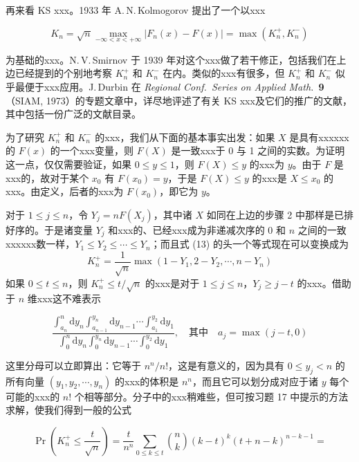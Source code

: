再来看 KS xxx。1933 年 A.\,N.\,Kolmogorov 提出了一个以xxx

\begin{equation}
K_n = \sqrt{n} \max_{-\infty < x < +\infty} |F_n(x) - F(x)| = \max(K_n^+, K_n^-) \tag{23}
\end{equation}

\noindent 为基础的xxx。N.\,V.\,Smirnov 于 1939 年对这个xxx做了若干修正，包括我们在上边已经提到的个别地考察 $K_n^+$ 和 $K_n^-$ 在内。类似的xxx有很多，但 $K_n^+$ 和 $K_n^-$ 似乎最便于xxx应用。J.\,Durbin 在 \textit{Regional Conf.\ Series on Applied Math.}\ \textbf{9}（SIAM, 1973）的专题文章中，详尽地评述了有关 KS xxx及它们的推广的文献，其中包括一份广泛的文献目录。

为了研究 $K_n^+$ 和 $K_n^-$ 的xxx，我们从下面的基本事实出发：如果 $X$ 是具有xxxxxx的 $F(x)$ 的一个xxx变量，则 $F(X)$ 是一致xxx于 0 与 1 之间的实数。为证明这一点，仅仅需要验证，如果 $0 \leqslant y \leqslant 1$，则 $F(X) \leqslant y$ 的xxx为 $y$。由于 $F$ 是xxx的，故对于某个 $x_0$ 有 $F(x_0) = y$，于是 $F(X) \leqslant y$ 的xxx是 $X \leqslant x_0$ 的xxx。由定义，后者的xxx为 $F(x_0)$，即它为 $y$。

对于 $1 \leqslant j \leqslant n$，令 $Y_j = nF(X_j)$，其中诸 $X$ 如同在上边的步骤 2 中那样是已排好序的。于是诸变量 $Y_j$ 和xxx的、已经xxx成为非递减次序的 0 和 $n$ 之间的一致xxxxxx数一样，$Y_1 \leqslant Y_2 \leqslant \cdots \leqslant Y_n$；而且式 (13) 的头一个等式现在可以变换成为
\[
K_n^+ = \frac{1}{\sqrt{n}} \max(1 - Y_1, 2 - Y_2, \cdots, n - Y_n)
\]
如果 $0 \leqslant t \leqslant n$，则 $K_n^+ \leqslant t/\sqrt{n}$ 的xxx是对于 $1 \leqslant j \leqslant n$，$Y_j \geqslant j - t$ 的xxx。借助于 $n$ 维xxx这不难表示

\begin{equation}
\frac{\displaystyle\int_{a_n}^{n} \mathrm{d}y_n \int_{a_{n-1}}^{y_n} \mathrm{d}y_{n-1} \cdots \int_{a_1}^{y_2} \mathrm{d}y_1}{\displaystyle\int_0^{n} \mathrm{d}y_n \int_0^{y_n} \mathrm{d}y_{n-1} \cdots \int_0^{y_2} \mathrm{d}y_1}, \quad \text{其中} \quad a_j = \max(j - t, 0) \tag{24}
\end{equation}

这里分母可以立即算出：它等于 $n^n / n!$，这是有意义的，因为具有 $0 \leqslant y_j < n$ 的所有向量 $(y_1, y_2, \cdots, y_n)$ 的xxx的体积是 $n^n$，而且它可以划分成对应于诸 $y$ 每个可能的xxx的 $n!$ 个相等部分。分子中的xxx稍难些，但可按习题 17 中提示的方法求解，使我们得到一般的公式

\begin{equation}
\Pr\!\left( K_n^+ \leqslant \frac{t}{\sqrt{n}} \right) = \frac{t}{n^n} \sum_{0 \leqslant k \leqslant t} \binom{n}{k} (k - t)^k (t + n - k)^{n-k-1} = \tag{25}
\end{equation}

